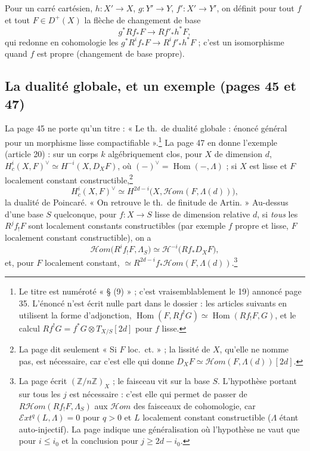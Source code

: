 \documentclass[11pt,a4paper]{article}
\begin{document}
Pour un carré cartésien, $h : X' \to X$, $g : Y' \to Y$, $f' : X' \to Y'$, on
définit pour tout $f$ et tout $F \in D^{+}(X)$ la flèche de changement de base
\[
  g^{*}Rf_{*}F \longrightarrow Rf'_{*}h^{*}F,
\]
qui redonne en cohomologie les $g^{*}R^{i}f_{*}F \to R^{i}f'_{*}h^{*}F$ ; c'est
un isomorphisme quand $f$ est propre (changement de base propre).

\subsection*{La dualité globale, et un exemple (pages 45 et 47)}

La page 45 ne porte qu'un titre : « Le th.\ de dualité globale : énoncé
général pour un morphisme lisse compactifiable ».\footnote{Le titre est
numéroté « § (9) » ; c'est vraisemblablement le 19) annoncé page 35. L'énoncé
n'est écrit nulle part dans le dossier : les articles suivants
en utilisent la forme d'adjonction, $\operatorname{Hom}(F, Rf^{!}G) \simeq
\operatorname{Hom}(Rf_{!}F, G)$, et le calcul $Rf^{!}G = f^{*}G \otimes
T_{X/S}[2d]$ pour $f$ lisse.} La page 47 en donne l'exemple (article 20) : sur
un corps $k$ algébriquement clos, pour $X$ de dimension $d$,
$H^{i}_{c}(X, F)^{\vee} \simeq H^{-i}(X, D_{X}F)$, où $(-)^{\vee} =
\operatorname{Hom}(-, \Lambda)$ ; si $X$ est lisse et $F$ localement constant
constructible,\footnote{La page dit seulement « Si $F$ loc.\ ct. » ; la
lissité de $X$, qu'elle ne nomme pas, est nécessaire, car c'est elle qui donne
$D_{X}F \simeq \mathcal{H}om(F, \Lambda(d))[2d]$.}
\[
  H^{i}_{c}(X, F)^{\vee} \simeq H^{2d-i}\bigl(X, \mathcal{H}om(F,
  \Lambda(d))\bigr),
\]
la dualité de Poincaré. « On retrouve le th.\ de finitude de Artin. » Au-dessus
d'une base $S$ quelconque, pour $f : X \to S$ lisse de dimension relative $d$,
si \emph{tous} les $R^{j}f_{!}F$ sont localement constants constructibles (par
exemple $f$ propre et lisse, $F$ localement constant constructible), on a
\[
  \mathcal{H}om\bigl(R^{i}f_{!}F, \Lambda_{S}\bigr) \simeq
  \mathcal{H}^{-i}\bigl(Rf_{*}D_{X}F\bigr),
\]
et, pour $F$ localement constant, $\simeq R^{2d-i}f_{*}\mathcal{H}om(F,
\Lambda(d))$.\footnote{La page écrit $(\mathbb{Z}/n\mathbb{Z})_{X}$ ; le faisceau
vit sur la base $S$. L'hypothèse portant sur tous les $j$ est nécessaire :
c'est elle qui permet de passer de $R\mathcal{H}om(Rf_{!}F, \Lambda_{S})$ aux
$\mathcal{H}om$ des faisceaux de cohomologie, car $\mathcal{E}xt^{q}(L,
\Lambda) = 0$ pour $q > 0$ et $L$ localement constant constructible
($\Lambda$ étant auto-injectif). La page indique une généralisation où
l'hypothèse ne vaut que pour $i \leq i_{0}$ et la conclusion pour $j \geq 2d -
i_{0}$.}
\end{document}
